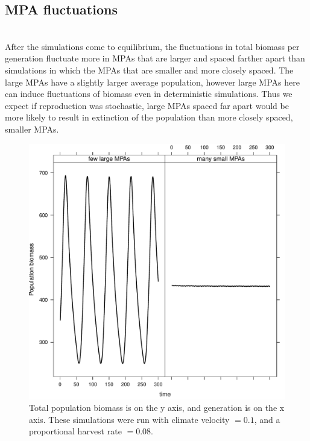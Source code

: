 \documentclass[12pt,english]{article}
\begin{document}
\subsection{MPA fluctuations \label{MPA}}
~\\After the simulations come to equilibrium, the fluctuations in total biomass per generation fluctuate more in MPAs that are larger and spaced farther apart than simulations in which the MPAs that are smaller and more closely spaced. The large MPAs have a slightly larger average population, however large MPAs here can induce fluctuations of biomass even in deterministic simulations. Thus we expect if reproduction was stochastic, large MPAs spaced far apart would be more likely to result in extinction of the population than more closely spaced, smaller MPAs. 
\begin{figure}[h]
\centering
\includegraphics[width=.75\textwidth]{plots/bounded_flux.pdf}
\caption{Total population biomass is on the y axis, and generation is on the x axis. These simulations were run with climate velocity $ = 0.1$, and a proportional harvest rate $= 0.08$. }
\end{figure}

\pagebreak

\end{document}
